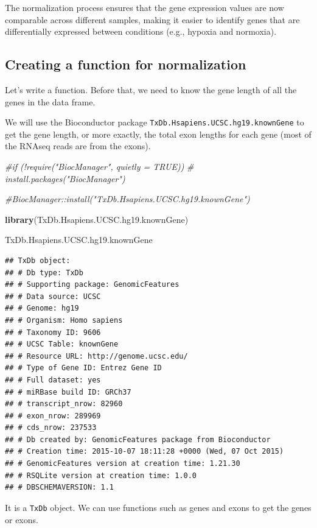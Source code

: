 \documentclass[
]{book}
\newenvironment{Shaded}{\begin{snugshade}}{\end{snugshade}}
\newcommand{\CommentTok}[1]{\textcolor[rgb]{0.56,0.35,0.01}{\textit{#1}}}
\newcommand{\FunctionTok}[1]{\textcolor[rgb]{0.13,0.29,0.53}{\textbf{#1}}}
\newcommand{\NormalTok}[1]{#1}
\begin{document}
The normalization process ensures that the gene expression values are now comparable across different samples, making it easier to identify genes that are differentially expressed between conditions (e.g., hypoxia and normoxia).

\hypertarget{creating-a-function-for-normalization}{%
\subsection{Creating a function for normalization}\label{creating-a-function-for-normalization}}

Let's write a function. Before that, we need to know the gene length of all the genes in the data frame.

We will use the Bioconductor package \texttt{TxDb.Hsapiens.UCSC.hg19.knownGene} to get the gene length, or more exactly, the total exon lengths for each gene (most of the RNAseq reads are from the exons).

\begin{Shaded}
\begin{Highlighting}[]
\CommentTok{\#if (!require("BiocManager", quietly = TRUE))}
\CommentTok{\#    install.packages("BiocManager")}

\CommentTok{\#BiocManager::install("TxDb.Hsapiens.UCSC.hg19.knownGene")}

\FunctionTok{library}\NormalTok{(TxDb.Hsapiens.UCSC.hg19.knownGene)}

\NormalTok{TxDb.Hsapiens.UCSC.hg19.knownGene}
\end{Highlighting}
\end{Shaded}

\begin{verbatim}
## TxDb object:
## # Db type: TxDb
## # Supporting package: GenomicFeatures
## # Data source: UCSC
## # Genome: hg19
## # Organism: Homo sapiens
## # Taxonomy ID: 9606
## # UCSC Table: knownGene
## # Resource URL: http://genome.ucsc.edu/
## # Type of Gene ID: Entrez Gene ID
## # Full dataset: yes
## # miRBase build ID: GRCh37
## # transcript_nrow: 82960
## # exon_nrow: 289969
## # cds_nrow: 237533
## # Db created by: GenomicFeatures package from Bioconductor
## # Creation time: 2015-10-07 18:11:28 +0000 (Wed, 07 Oct 2015)
## # GenomicFeatures version at creation time: 1.21.30
## # RSQLite version at creation time: 1.0.0
## # DBSCHEMAVERSION: 1.1
\end{verbatim}

It is a \texttt{TxDb} object. We can use functions such as genes and exons to get the genes or exons.
\end{document}
